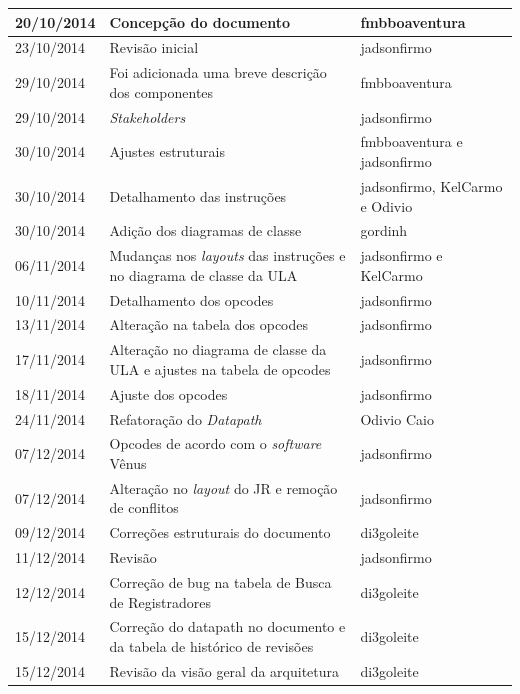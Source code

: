 \documentclass{report}
\begin{document}
\begin{center}
\begin{longtable}[pos]{|m{2cm} | m{8cm} | m{4cm}|}
		20/10/2014 & Concepção do documento & fmbboaventura \\ \hline
		23/10/2014 & Revisão inicial & jadsonfirmo \\ \hline
		29/10/2014 & Foi adicionada uma breve descrição dos componentes & fmbboaventura \\ \hline       
		29/10/2014 & \textit{Stakeholders} & jadsonfirmo \\ \hline
		30/10/2014 & Ajustes estruturais & fmbboaventura e jadsonfirmo \\ \hline
		30/10/2014 & Detalhamento das instruções & jadsonfirmo, KelCarmo e Odivio \\ \hline
		30/10/2014 & Adição dos diagramas de classe & gordinh \\ \hline
		06/11/2014 & Mudanças nos \textit{layouts} das instruções e no diagrama de classe da ULA & jadsonfirmo e KelCarmo \\ \hline
		10/11/2014 & Detalhamento dos opcodes & jadsonfirmo \\ \hline
		13/11/2014 & Alteração na tabela dos opcodes & jadsonfirmo \\ \hline
		17/11/2014 & Alteração no diagrama de classe da ULA e ajustes na tabela de opcodes & jadsonfirmo \\ \hline
		18/11/2014 & Ajuste dos opcodes & jadsonfirmo \\ \hline
		24/11/2014 & Refatoração do \textit{Datapath} & Odivio Caio \\ \hline
		07/12/2014 & Opcodes de acordo com o \textit{software} Vênus & jadsonfirmo \\ \hline
		07/12/2014 & Alteração no \textit{layout} do JR e remoção de conflitos & jadsonfirmo \\ \hline
		09/12/2014 & Correções estruturais do documento & di3goleite \\ \hline
		11/12/2014 & Revisão & jadsonfirmo \\ \hline
		12/12/2014 & Correção de bug na tabela de Busca de Registradores & di3goleite \\ \hline
		15/12/2014 & Correção do datapath no documento e da tabela de histórico de revisões & di3goleite \\ \hline
		15/12/2014 & Revisão da visão geral da arquitetura & di3goleite \\ \hline
	\end{longtable}
\end{center}

\tableofcontents
\end{document}
